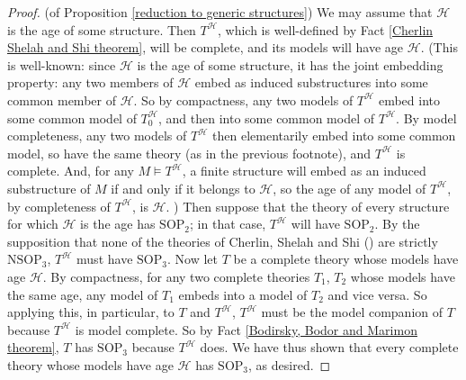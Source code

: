 \documentclass{amsart}
\theoremstyle{definition}
\theoremstyle{remark}
\numberwithin{equation}{section}
\begin{document}
\begin{proof}
    (of Proposition \ref{reduction to generic structures}) We may assume that $\mathcal{H}$ is the age of some structure. Then $T^{\mathcal{H}}$, which is well-defined by Fact \ref{Cherlin Shelah and Shi theorem}, will be complete, and its models will have age $\mathcal{H}$. (This is well-known: since $\mathcal{H}$ is the age of some structure, it has the joint embedding property: any two members of $\mathcal{H}$ embed as induced substructures into some common member of $\mathcal{H}$. So by compactness, any two models of $T^{\mathcal{H}}$ embed into some common model of $T_{0}^{\mathcal{H}}$, and then into some common model of $T^{\mathcal{H}}$. By model completeness, any two models of $T^{\mathcal{H}}$ then elementarily embed into some common model, so have the same theory (as in the previous footnote), and $T^{\mathcal{H}}$ is complete. And, for any $M \models T^{\mathcal{H}}$, a finite structure will embed as an induced substructure of $M$ if and only if it belongs to $\mathcal{H}$, so the age of any model of $T^{\mathcal{H}}$, by completeness of $T^{\mathcal{H}}$, is $\mathcal{H}$. ) Then suppose that the theory of every structure for which $\mathcal{H}$ is the age has $\mathrm{SOP}_{2}$; in that case, $T^{\mathcal{H}}$ will have $\mathrm{SOP}_{2}$. By the supposition that none of the theories of Cherlin, Shelah and Shi (\cite{CSS99}) are strictly $\mathrm{NSOP}_{3}$, $T^{\mathcal{H}}$ must have $\mathrm{SOP}_{3}$. Now let $T$ be a complete theory whose models have age $\mathcal{H}$. By compactness, for any two complete theories $T_{1}$, $T_{2}$ whose models have the same age, any model of $T_{1}$ embeds into a model of $T_{2}$ and vice versa. So applying this, in particular, to $T$ and $T^{\mathcal{H}}$, $T^{\mathcal{H}}$ must be the model companion of $T$ because $T^{\mathcal{H}}$ is model complete. So by Fact \ref{Bodirsky, Bodor and Marimon theorem}, $T$ has $\mathrm{SOP}_{3}$ because $T^{\mathcal{H}}$ does. We have thus shown that every complete theory whose models have age $\mathcal{H}$ has $\mathrm{SOP}_{3}$, as desired.
\end{proof}
\end{document}
